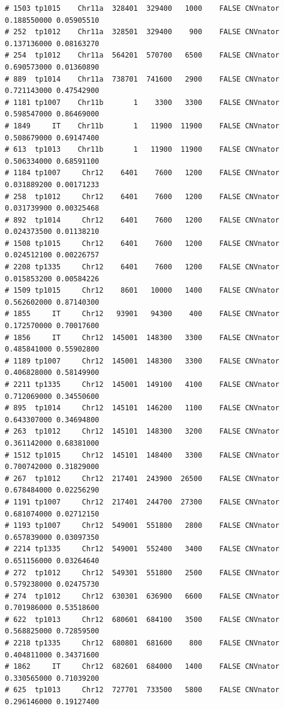 \documentclass{article}\usepackage[]{graphicx}\usepackage[]{color}
\makeatletter
\newenvironment{kframe}{%
 \def\at@end@of@kframe{}%
 \ifinner\ifhmode%
  \def\at@end@of@kframe{\end{minipage}}%
  \begin{minipage}{\columnwidth}%
 \fi\fi%
 \def\FrameCommand##1{\hskip\@totalleftmargin \hskip-\fboxsep
 \colorbox{shadecolor}{##1}\hskip-\fboxsep
     \hskip-\linewidth \hskip-\@totalleftmargin \hskip\columnwidth}%
 \MakeFramed {\advance\hsize-\width
   \@totalleftmargin\z@ \linewidth\hsize
   \@setminipage}}%
 {\par\unskip\endMakeFramed%
 \at@end@of@kframe}
\newenvironment{knitrout}{}{} %
\makeatother
\begin{document}
\begin{knitrout}
\begin{kframe}
\begin{verbatim}
# 1503 tp1015    Chr11a  328401  329400   1000    FALSE CNVnator 0.188550000 0.05905510
# 252  tp1012    Chr11a  328501  329400    900    FALSE CNVnator 0.137136000 0.08163270
# 254  tp1012    Chr11a  564201  570700   6500    FALSE CNVnator 0.690573000 0.01360890
# 889  tp1014    Chr11a  738701  741600   2900    FALSE CNVnator 0.721143000 0.47542900
# 1181 tp1007    Chr11b       1    3300   3300    FALSE CNVnator 0.598547000 0.86469000
# 1849     IT    Chr11b       1   11900  11900    FALSE CNVnator 0.508679000 0.69147400
# 613  tp1013    Chr11b       1   11900  11900    FALSE CNVnator 0.506334000 0.68591100
# 1184 tp1007     Chr12    6401    7600   1200    FALSE CNVnator 0.031889200 0.00171233
# 258  tp1012     Chr12    6401    7600   1200    FALSE CNVnator 0.031739900 0.00325468
# 892  tp1014     Chr12    6401    7600   1200    FALSE CNVnator 0.024373500 0.01138210
# 1508 tp1015     Chr12    6401    7600   1200    FALSE CNVnator 0.024512100 0.00226757
# 2208 tp1335     Chr12    6401    7600   1200    FALSE CNVnator 0.015853200 0.00584226
# 1509 tp1015     Chr12    8601   10000   1400    FALSE CNVnator 0.562602000 0.87140300
# 1855     IT     Chr12   93901   94300    400    FALSE CNVnator 0.172570000 0.70017600
# 1856     IT     Chr12  145001  148300   3300    FALSE CNVnator 0.485841000 0.55902800
# 1189 tp1007     Chr12  145001  148300   3300    FALSE CNVnator 0.406828000 0.58149900
# 2211 tp1335     Chr12  145001  149100   4100    FALSE CNVnator 0.712069000 0.34550600
# 895  tp1014     Chr12  145101  146200   1100    FALSE CNVnator 0.643307000 0.34694800
# 263  tp1012     Chr12  145101  148300   3200    FALSE CNVnator 0.361142000 0.68381000
# 1512 tp1015     Chr12  145101  148400   3300    FALSE CNVnator 0.700742000 0.31829000
# 267  tp1012     Chr12  217401  243900  26500    FALSE CNVnator 0.678484000 0.02256290
# 1191 tp1007     Chr12  217401  244700  27300    FALSE CNVnator 0.681074000 0.02712150
# 1193 tp1007     Chr12  549001  551800   2800    FALSE CNVnator 0.657839000 0.03097350
# 2214 tp1335     Chr12  549001  552400   3400    FALSE CNVnator 0.651156000 0.03264640
# 272  tp1012     Chr12  549301  551800   2500    FALSE CNVnator 0.579238000 0.02475730
# 274  tp1012     Chr12  630301  636900   6600    FALSE CNVnator 0.701986000 0.53518600
# 622  tp1013     Chr12  680601  684100   3500    FALSE CNVnator 0.568825000 0.72859500
# 2218 tp1335     Chr12  680801  681600    800    FALSE CNVnator 0.404811000 0.34371600
# 1862     IT     Chr12  682601  684000   1400    FALSE CNVnator 0.330565000 0.71039200
# 625  tp1013     Chr12  727701  733500   5800    FALSE CNVnator 0.296146000 0.19127400

\end{verbatim}
\end{kframe}
\end{knitrout}
\end{document}
